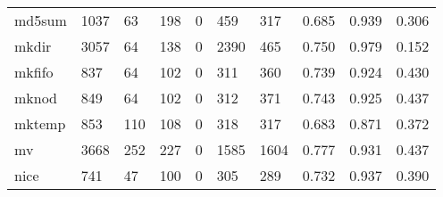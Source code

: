 \begin{longtable}{lp{1.3cm}p{1.3cm}p{1.3cm}p{1.3cm}p{1.3cm}p{1.3cm}p{1.3cm}p{1.3cm}p{1.3cm}}
md5sum    &                   1037 &                                 63 &                               198 &                                0 &                               459 &                             317 &                                0.685 &                                  0.939 &                                0.306 \\
mkdir     &                   3057 &                                 64 &                               138 &                                0 &                              2390 &                             465 &                                0.750 &                                  0.979 &                                0.152 \\
mkfifo    &                    837 &                                 64 &                               102 &                                0 &                               311 &                             360 &                                0.739 &                                  0.924 &                                0.430 \\
mknod     &                    849 &                                 64 &                               102 &                                0 &                               312 &                             371 &                                0.743 &                                  0.925 &                                0.437 \\
mktemp    &                    853 &                                110 &                               108 &                                0 &                               318 &                             317 &                                0.683 &                                  0.871 &                                0.372 \\
mv        &                   3668 &                                252 &                               227 &                                0 &                              1585 &                            1604 &                                0.777 &                                  0.931 &                                0.437 \\
nice      &                    741 &                                 47 &                               100 &                                0 &                               305 &                             289 &                                0.732 &                                  0.937 &                                0.390 \\

\end{longtable}
